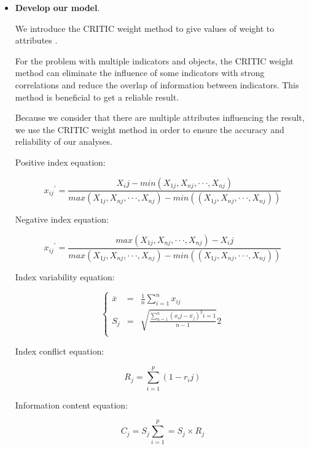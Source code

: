 \documentclass{mcmthesis}
\begin{document}
\begin{itemize}
    The above data will be used in our subsequent weight estimation.

    \item {\bf Develop our model}.
    
    We introduce the CRITIC weight method to give values of weight to attributes \cite{5}.

    For the problem with multiple indicators and objects, the CRITIC weight method can eliminate the influence of some indicators with strong correlations and reduce the overlap of information between indicators. This method is beneficial to get a reliable result. 

    Because we consider that there are multiple attributes influencing the result, we use the CRITIC weight method in order to ensure the accuracy and reliability of our analyses.
    
    Positive index equation:
    
    \begin{equation} \label{eq6}    
        {{x}_{ij}}^{'} = \frac{X_ij-min(X_{1j},X_{nj},···,X_{nj})}{max(X_{1j},X_{nj},···,X_{nj})-min((X_{1j},X_{nj},···,X_{nj}))} 
    \end{equation}

    Negative index equation:   

    \begin{equation} \label{eq7}
        {{x}_{ij}}^{'} = \frac{max(X_{1j},X_{nj},···,X_{nj})-X_ij}{max(X_{1j},X_{nj},···,X_{nj})-min((X_{1j},X_{nj},···,X_{nj}))} 
    \end{equation}

    Index variability equation:

    $$
    \left\{ 
    \begin{matrix}
        \overline{x} & = & \frac{1}{n}\sum_{i=1}^{n}x_{ij} \\
        S_j & = & \sqrt{\frac{\sum_{n = 1}^{n}(x_ij-\overline{x_j} )^{2} i=1 }{n-1} }2 \\
    \end{matrix}
    \right.
    $$
   
    Index conflict equation:

    \begin{equation} \label{eq9}
    R_j = \sum_{i = 1}^{p}(1-r_ij)      
    \end{equation}

    Information content equation:

    \begin{equation} \label{eq10}
       C_j = S_j\sum_{i = 1}^{p}=S_j\times R_j       
        \end{equation}


\end{itemize}
\end{document}
